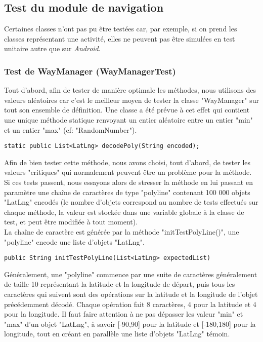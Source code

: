\subsection{Test du module de navigation}

Certaines classes n'ont pas pu être testées car, par exemple, si on prend les classes représentant une activité, elles ne peuvent pas être simulées en test unitaire autre que sur \textit{Android}. 

\subsubsection{Test de WayManager (WayManagerTest)}

Tout d'abord, afin de tester de manière optimale les méthodes, nous utilisons des valeurs aléatoires car c'est le meilleur moyen de tester la classe "WayManager" sur tout son ensemble de définition. Une classe a été prévue à cet effet qui contient une unique méthode statique renvoyant un entier aléatoire entre un entier "min" et un entier "max" (cf: "RandomNumber").\\

\begin{lstlisting}
static public List<LatLng> decodePoly(String encoded);
\end{lstlisting}

\bigskip Afin de bien tester cette méthode, nous avons choisi, tout d'abord, de tester les valeurs "critiques" qui normalement peuvent être un problème pour la méthode. Si ces tests passent, nous essayons alors de stresser la méthode en lui passant en paramètre une chaîne de caractères de type "polyline" contenant 100 000 objets "LatLng" encodés (le nombre d'objets correspond au nombre de tests effectués sur chaque méthode, la valeur est stockée dans une variable globale à la classe de test, et peut être modifiée à tout moment).\\ 
La chaîne de caractère est générée par la méthode "initTestPolyLine()", une "polyline" encode une liste d'objets "LatLng".\\

\begin{lstlisting}
public String initTestPolyLine(List<LatLng> expectedList)
\end{lstlisting}

Généralement, une "polyline" commence par une suite de caractères généralement de taille 10 représentant la latitude et la longitude de départ, puis tous les caractères qui suivent sont des opérations sur la latitude et la longitude de l'objet précédemment décodé. Chaque opération fait 8 caractères, 4 pour la latitude et 4 pour la longitude. Il faut faire attention à ne pas dépasser les valeur "min" et "max" d'un objet "LatLng", à savoir [-90,90] pour la latitude et [-180,180] pour la longitude, tout en créant en parallèle une liste d'objets "LatLng" témoin.\newline


